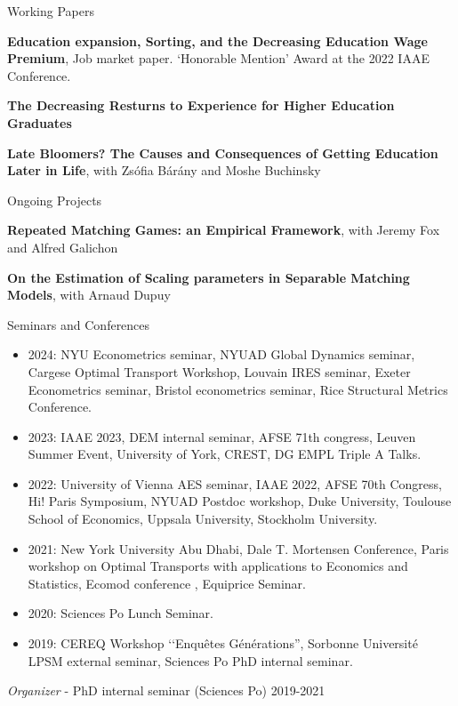 \documentclass{resume} %
\begin{document}
\begin{rSection}{Working Papers}

  {\bf Education expansion, Sorting, and the Decreasing Education Wage Premium}, Job market paper. ‘Honorable Mention' Award at the 2022 IAAE Conference.
  
  {\bf The Decreasing Resturns to Experience for Higher Education Graduates}

  {\bf Late Bloomers? The Causes and Consequences of Getting Education Later in Life}, with Zsófia Bárány and Moshe Buchinsky
  
  \end{rSection}

\begin{rSection}{Ongoing Projects}

{\bf Repeated Matching Games: an Empirical Framework}, with Jeremy Fox and Alfred Galichon

{\bf On the Estimation of Scaling parameters in Separable Matching Models}, with Arnaud Dupuy

\end{rSection}


\begin{rSection}{Seminars and Conferences}
\begin{itemize}
  \item 2024: NYU Econometrics seminar, NYUAD Global Dynamics seminar, Cargese Optimal Transport Workshop, Louvain IRES seminar, Exeter Econometrics seminar, Bristol econometrics seminar, Rice Structural Metrics Conference.  
  \item 2023: IAAE 2023, DEM internal seminar, AFSE 71th congress, Leuven Summer Event, University of York, CREST, DG EMPL Triple A Talks.
  \item 2022: University of Vienna AES seminar, IAAE 2022, AFSE 70th Congress, Hi! Paris Symposium, NYUAD Postdoc workshop, Duke University, Toulouse School of Economics, Uppsala University, Stockholm University.
  \item 2021: New York University Abu Dhabi, Dale T. Mortensen Conference, Paris workshop on Optimal Transports with applications to Economics and Statistics, Ecomod conference , Equiprice Seminar.
  \item 2020: Sciences Po Lunch Seminar.
  \item 2019: CEREQ Workshop ‘‘Enquêtes Générations'', Sorbonne Université LPSM external seminar, Sciences Po PhD internal seminar.
\end{itemize}

{\em Organizer} - PhD internal seminar (Sciences Po) \hfill {2019-2021}

\end{rSection}
\end{document}

